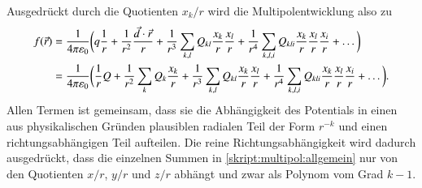 Ausgedrückt durch die Quotienten $x_k/r$ wird die Multipolentwicklung
also zu
\begin{align}
f(\vec r)
&=
\frac{1}{4\pi\varepsilon_0}
\biggl(
q
\frac{1}{r}
+
\frac{1}{r^2} \frac{\vec{d}\cdot\vec{r}}{r}
+
\frac{1}{r^3} \sum_{k,l}Q_{kl}\frac{x_k}{r}\frac{x_l}{r}
+
\frac{1}{r^4} \sum_{k,l,i}Q_{kli}\frac{x_k}{r}\frac{x_l}{r}\frac{x_i}{r}
+
\dots
\biggr)
\notag
\\
&=
\frac{1}{4\pi\varepsilon_0}
\biggl(
\frac{1}{r} Q
+
\frac{1}{r^2} \sum_{k}Q_k \frac{x_k}{r}
+
\frac{1}{r^3} \sum_{k,l}Q_{kl}\frac{x_k}{r}\frac{x_l}{r}
+
\frac{1}{r^4} \sum_{k,l,i}Q_{kli}\frac{x_k}{r}\frac{x_l}{r}\frac{x_i}{r}
+
\dots
\biggr).
\label{skript:multipol:allgemein}
\end{align}
Allen Termen ist gemeinsam, dass sie die Abhängigkeit des Potentials in einen
aus physikalischen Gründen plausiblen radialen Teil der Form $r^{-k}$
und einen richtungsabhängigen Teil aufteilen.
Die reine Richtungsabhängigkeit wird dadurch ausgedrückt, dass
die einzelnen Summen in \eqref{skript:multipol:allgemein}
nur von den Quotienten $x/r$, $y/r$ und $z/r$ abhängt und zwar
als Polynom vom Grad $k-1$.



